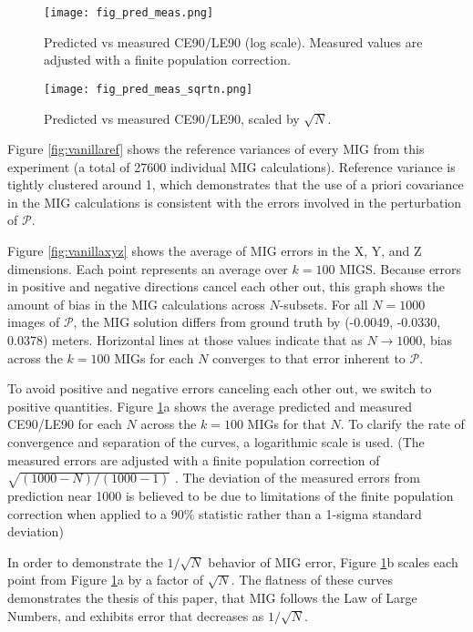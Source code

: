 \documentclass[10pt]{amsart}
\newcommand{\Pimg}{\mathcal{P}}
\begin{document}
\begin{figure}
\texttt{[image: fig\_pred\_meas.png]}
\caption{\label{fig:vanilla_pred_meas}Predicted vs measured CE90/LE90 (log
  scale). Measured values are adjusted with a finite population correction.}
\end{figure}

\begin{figure}
\texttt{[image: fig\_pred\_meas\_sqrtn.png]}
\caption{\label{fig:vanilla_pred_meas_sqrtn}Predicted vs measured CE90/LE90,
  scaled by $\sqrt{N}$.}
\end{figure}

Figure \ref{fig:vanillaref} shows the reference variances of every MIG from this
experiment (a total of 27600 individual MIG calculations). Reference variance is
tightly clustered around 1, which demonstrates that the use of a priori
covariance in the MIG calculations is consistent with the errors involved in the
perturbation of $\Pimg$.

Figure \ref{fig:vanillaxyz} shows the average of MIG errors in the X, Y, and Z
dimensions. Each point represents an average over $k=100$ MIGS. Because errors
in positive and negative directions cancel each other out, this graph shows the
amount of bias in the MIG calculations across $N$-subsets. For all $N=1000$
images of $\Pimg$, the MIG solution differs from ground truth by (-0.0049,
-0.0330, 0.0378) meters. Horizontal lines at those values indicate that as
$N\rightarrow 1000$, bias across the $k=100$ MIGs for each $N$ converges to that
error inherent to $\Pimg$.

To avoid positive and negative errors canceling each other out, we switch to
positive quantities. Figure \ref{fig:vanilla_pred_meas}a shows the average
predicted and measured CE90/LE90 for each $N$ across the $k=100$ MIGs for that
$N$. To clarify the rate of convergence and separation of the curves, a
logarithmic scale is used. (The measured errors are adjusted with a finite
population correction of $\sqrt{(1000-N)/(1000-1)}$ \cite{FPC}. The deviation of
the measured errors from prediction near 1000 is believed to be due to
limitations of the finite population correction when applied to a 90\% statistic
rather than a 1-sigma standard deviation)

In order to demonstrate the $1/\sqrt{N}$ behavior of MIG error, Figure
\ref{fig:vanilla_pred_meas}b scales each point from Figure
\ref{fig:vanilla_pred_meas}a by a factor of $\sqrt N$. The flatness of these
curves demonstrates the thesis of this paper, that MIG follows the Law of Large
Numbers, and exhibits error that decreases as $1/\sqrt N$.
\end{document}
